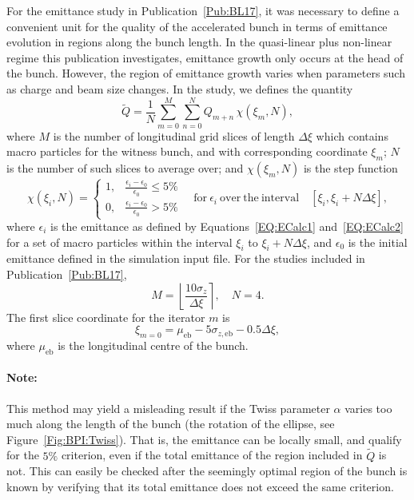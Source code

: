 For the emittance study in Publication~\ref{Pub:BL17}, it was necessary to define a convenient unit for the quality of the accelerated bunch in terms of emittance evolution in regions along the bunch length.
In the quasi-linear plus non-linear regime this publication investigates, emittance growth only occurs at the head of the bunch.
However, the region of emittance growth varies when parameters such as charge and beam size changes.
In the study, we defines the quantity
\begin{equation}
    \tilde{Q} = \frac{1}{N} \sum_{m=0}^{M} \sum_{n=0}^{N} Q_{m+n}\,\chi(\xi_{m},N),\label{EQ:BeamQ}
\end{equation}
where $M$ is the number of longitudinal grid slices of length $\Delta\xi$ which contains macro particles for the witness bunch, and with corresponding coordinate $\xi_{m}$; $N$ is the number of such slices to average over; and $\chi(\xi_{m},N)$ is the step function
\begin{equation}
    \chi(\xi_{i},N) =
    \begin{cases}
        1, & \frac{\epsilon_{i} - \epsilon_{0}}{\epsilon_{0}} \leq 5\% \\
        0, & \frac{\epsilon_{i} - \epsilon_{0}}{\epsilon_{0}} > 5\%
    \end{cases}
    \quad\mathrm{for~}\epsilon_{i}\mathrm{~over~the~interval}\quad
    [\xi_{i}, \xi_{i} + N\Delta\xi],
\end{equation}
where $\epsilon_{i}$ is the emittance as defined by Equations~\ref{EQ:ECalc1} and~\ref{EQ:ECalc2} for a set of macro particles within the interval $\xi_{i}$ to $\xi_{i} + N\Delta\xi$, and $\epsilon_{0}$ is the initial emittance defined in the simulation input file.
For the studies included in Publication~\ref{Pub:BL17},
\begin{equation}
    M = \left\lfloor \frac{10\sigma_{z}}{\Delta\xi} \right\rceil, \quad
    N = 4.
\end{equation}
The first slice coordinate for the iterator $m$ is
\begin{equation}
    \xi_{m=0} = \mu_{\mathrm{eb}} - 5\sigma_{z,\mathrm{eb}} - 0.5\Delta\xi,
\end{equation}
where $\mu_{\mathrm{eb}}$ is the longitudinal centre of the bunch.

\paragraph{Note:} This method may yield a misleading result if the Twiss parameter $\alpha$ varies too much along the length of the bunch (the rotation of the ellipse, see Figure~\ref{Fig:BPI:Twiss}).
That is, the emittance can be locally small, and qualify for the $5\%$ criterion, even if the total emittance of the region included in $\tilde{Q}$ is not.
This can easily be checked after the seemingly optimal region of the bunch is known by verifying that its total emittance does not exceed the same criterion.


